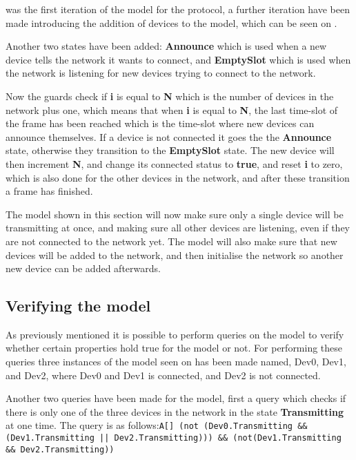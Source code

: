  was the first iteration of the model for the protocol, a further iteration have been made introducing the addition of devices to the model, which can be seen on .

Another two states have been added: \textbf{Announce} which is used when a new device tells the network it wants to connect, and \textbf{EmptySlot} which is used when the network is listening for new devices trying to connect to the network.

Now the guards check if \textbf{i} is equal to \textbf{N} which is the number of devices in the network plus one, which means that when \textbf{i} is equal to \textbf{N}, the last time-slot of the frame has been reached which is the time-slot where new devices can announce themselves.
If a device is not connected it goes the the \textbf{Announce} state, otherwise they transition to the \textbf{EmptySlot} state.
The new device will then increment \textbf{N}, and change its connected status to \textbf{true}, and reset \textbf{i} to zero, which is also done for the other devices in the network, and after these transition a frame has finished.



The model shown in this section will now make sure only a single device will be transmitting at once, and making sure all other devices are listening, even if they are not connected to the network yet.
The model will also make sure that new devices will be added to the network, and then initialise the network so another new device can be added afterwards.

\subsection{Verifying the model}

As previously mentioned it is possible to perform queries on the model to verify whether certain properties hold true for the model or not.
For performing these queries three instances of the model seen on  has been made named, Dev0, Dev1, and Dev2, where Dev0 and Dev1 is connected, and Dev2 is not connected. 

Another two queries have been made for the model, first a query which checks if there is only one of the three devices in the network in the state \textbf{Transmitting} at one time.
The query is as follows:\texttt{A[] (not (Dev0.Transmitting \&\& (Dev1.Transmitting || Dev2.Transmitting))) \&\& (not(Dev1.Transmitting \&\& Dev2.Transmitting))}

